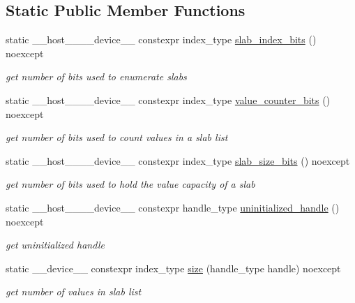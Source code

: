 \subsection*{Static Public Member Functions}
\begin{DoxyCompactItemize}
\item 
static \+\_\+\+\_\+host\+\_\+\+\_\+\+\_\+\+\_\+device\+\_\+\+\_\+ constexpr index\+\_\+type \hyperlink{classwarpcore_1_1storage_1_1multi__value_1_1DynamicSlabListStore_a20efaad0116184429778d736723c30f3}{slab\+\_\+index\+\_\+bits} () noexcept
\begin{DoxyCompactList}\small\item\em get number of bits used to enumerate slabs \end{DoxyCompactList}\item 
static \+\_\+\+\_\+host\+\_\+\+\_\+\+\_\+\+\_\+device\+\_\+\+\_\+ constexpr index\+\_\+type \hyperlink{classwarpcore_1_1storage_1_1multi__value_1_1DynamicSlabListStore_aff75cc3f371c2b31b569ff585f9ac900}{value\+\_\+counter\+\_\+bits} () noexcept
\begin{DoxyCompactList}\small\item\em get number of bits used to count values in a slab list \end{DoxyCompactList}\item 
static \+\_\+\+\_\+host\+\_\+\+\_\+\+\_\+\+\_\+device\+\_\+\+\_\+ constexpr index\+\_\+type \hyperlink{classwarpcore_1_1storage_1_1multi__value_1_1DynamicSlabListStore_a16f77ea7e30c30b17af19a229464ed42}{slab\+\_\+size\+\_\+bits} () noexcept
\begin{DoxyCompactList}\small\item\em get number of bits used to hold the value capacity of a slab \end{DoxyCompactList}\item 
static \+\_\+\+\_\+host\+\_\+\+\_\+\+\_\+\+\_\+device\+\_\+\+\_\+ constexpr handle\+\_\+type \hyperlink{classwarpcore_1_1storage_1_1multi__value_1_1DynamicSlabListStore_a647790aa072589d7296b7ea57436f297}{uninitialized\+\_\+handle} () noexcept
\begin{DoxyCompactList}\small\item\em get uninitialized handle \end{DoxyCompactList}\item 
static \+\_\+\+\_\+device\+\_\+\+\_\+ constexpr index\+\_\+type \hyperlink{classwarpcore_1_1storage_1_1multi__value_1_1DynamicSlabListStore_a79dffb54a0930061383f69bbc769c6d1}{size} (handle\+\_\+type handle) noexcept
\begin{DoxyCompactList}\small\item\em get number of values in slab list \end{DoxyCompactList}\end{DoxyCompactItemize}


